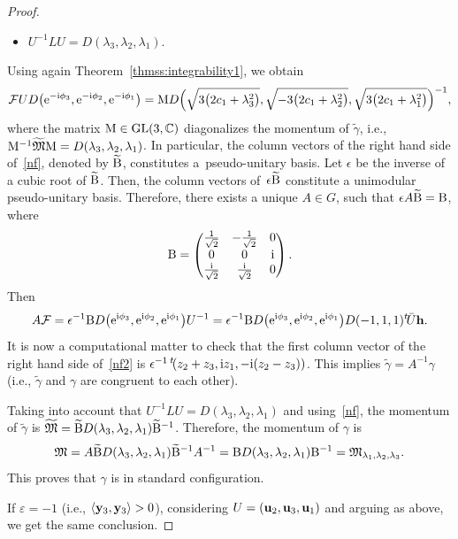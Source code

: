 \documentclass[pdftex]{sigma}
\numberwithin{equation}{section}
\def\C{\mathbb{C}}
\begin{document}
\begin{proof}
\begin{itemize}
\item ${U}^{-1}{L}{U}=D(\lambda_3,\lambda_2,\lambda_1)$.
\end{itemize}
Using again Theorem~\ref{thmss:integrability1}, we obtain
\begin{gather}\label{nf}
{\mathcal F} {U} D\big({\rm e}^{-{\rm i}\phi_3}, {\rm e}^{-{\rm i}\phi_2}, {\rm e}^{-{\rm i}\phi_1}\big)=
{\rm M}D\Big(\sqrt{3\big(2c_1+\lambda_3^2\big)}, \sqrt{-3\big(2c_1+\lambda_2^2\big)}, \sqrt{3\big(2c_1+\lambda_1^2\big)}\Big)^{-1},
 \end{gather}
where the matrix ${\rm M}\in {\rm GL}(3,\C)$ diagonalizes the momentum of $\widetilde{\gamma}$, i.e.,
${\rm M}^{-1}\widetilde{{\mathfrak M}}{\rm M}=
D(\lambda_3,\lambda_2,\lambda_1)$.
In particular, the column vectors of the right hand side of~\eqref{nf}, denoted by $\widetilde{{\rm B}}$,
constitutes a~pseudo-unitary basis. Let $\epsilon$ be the inverse of a cubic root of ${\widetilde{\rm B}}$.
Then, the column vectors of~$\epsilon {\widetilde{\rm B}}$ constitute a unimodular pseudo-unitary basis.
Therefore, there exists a unique ${A}\in {G}$, such that
$\epsilon {A}{\widetilde{\rm B}}={\rm B}$, where
%
\begin{equation}\label{standardpsh}
 {\rm B}=\begin{pmatrix}
 \frac{1}{\sqrt{2} }&-\frac{1}{\sqrt{2}} & 0\\
 0 & 0 &{\rm i}\\
 \frac{{\rm i}}{\sqrt{2}} &\frac{{\rm i}}{\sqrt{2}} & 0\\
 \end{pmatrix}.
 \end{equation}
Then
\begin{equation}\label{nf2}
{A}{\mathcal F}=\epsilon^{-1}{\rm B} D\big({\rm e}^{{\rm i}\phi_3}, {\rm e}^{{\rm i}\phi_2}, {\rm e}^{{\rm i}\phi_1}\big){U}^{-1}=
\epsilon^{-1}{\rm B}D\big({\rm e}^{{\rm i}\phi_3}, {\rm e}^{{\rm i}\phi_2}, {\rm e}^{{\rm i}\phi_1}\big)D(-1,1,1){^t\!{}\bar{U}}{\bf h}.
 \end{equation}
It is now a computational matter to check that the first column vector of the right hand side of~\eqref{nf2} is
$\epsilon^{-1}\,{^t\!(}z_2+z_3, {\rm i}z_1,- {\rm i}(z_2-z_3))$.
This implies $\widetilde{\gamma}={A}^{-1}\gamma$ (i.e., $ \widetilde{\gamma}$ and $\gamma$ are congruent to each other).

Taking into account that ${U}^{-1}{L}{U}=D(\lambda_3,\lambda_2,\lambda_1)$ and using~\eqref{nf}, the momentum
of $\widetilde{\gamma}$ is
$\widetilde{{\mathfrak M}}=\widetilde{{\rm B}}D(\lambda_3,\lambda_2,\lambda_1)\widetilde{{\rm B}}^{-1}$.
Therefore, the momentum of $\gamma$ is
\[
{\mathfrak M}={A}\widetilde{{\rm B}}D(\lambda_3,\lambda_2,\lambda_1)\widetilde{{\rm B}}^{-1}{A}^{-1}=
{\rm B}D(\lambda_3,\lambda_2,\lambda_1){\rm B}^{-1}={\mathfrak M}_{\lambda_1,\lambda_2,\lambda_3}.
\]
This proves that $\gamma$ is in standard configuration.

If $\varepsilon =-1$ (i.e., $\langle {\bf y}_3,{\bf y}_3\rangle>0$), considering ${U}=({\bf u}_2,{\bf u}_3,{\bf u}_1)$
and arguing as above, we get the same conclusion.
\end{proof}
\end{document}
